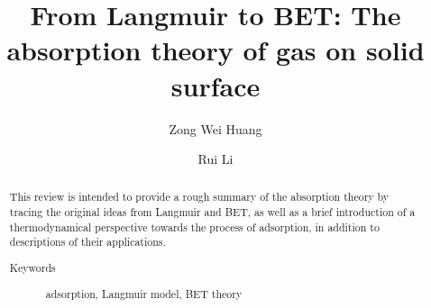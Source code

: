 \documentclass[%
 reprint,
 amsmath,amssymb,
 aps,
10.5pt,
]{revtex4-1}
\begin{document}

\title{From Langmuir to BET: The absorption theory of gas on solid surface}%



\author{Zong Wei Huang}
%

\author{Rui Li}
%



\begin{abstract}
This review is intended to provide a rough summary of the absorption theory by tracing the original ideas from Langmuir and BET, as well as a brief introduction of a thermodynamical perspective towards the process of adsorption, in addition to descriptions of their applications.
\begin{description}
\item[Keywords]
adsorption, Langmuir model, BET theory
\end{description}
\end{abstract}

\maketitle
\end{document}
